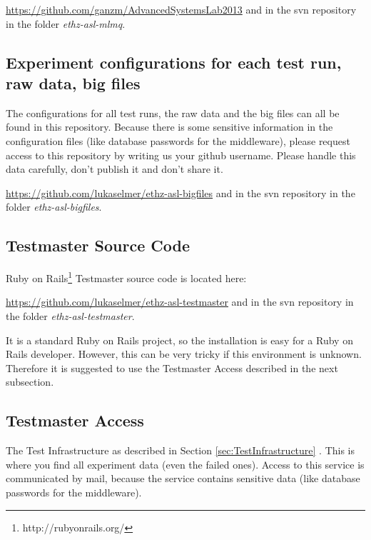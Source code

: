 \documentclass[a4paper]{article}
\begin{document}
\url{https://github.com/ganzm/AdvancedSystemsLab2013}
and in the svn repository in the folder \textit{ethz-asl-mlmq}.


\subsection{Experiment configurations for each test run, raw data, big files}
The configurations for all test runs, the raw data and the big files can all be found in this repository. Because there is some sensitive information in the configuration files (like database passwords for the middleware), please request access to this repository by writing us your github username. Please handle this data carefully, don't publish it and don't share it.

\url{https://github.com/lukaselmer/ethz-asl-bigfiles}
and in the svn repository in the folder \textit{ethz-asl-bigfiles}.

%

\subsection{Testmaster Source Code}
Ruby on Rails\footnote{http://rubyonrails.org/} Testmaster source code is located here:

\url{https://github.com/lukaselmer/ethz-asl-testmaster}
and in the svn repository in the folder \textit{ethz-asl-testmaster}.

It is a standard Ruby on Rails project, so the installation is easy for a Ruby on Rails developer. However, this can be very tricky if this environment is unknown. Therefore it is suggested to use the Testmaster Access described in the next subsection.

\subsection{Testmaster Access}
The Test Infrastructure as described in Section \ref{sec:TestInfrastructure}   . This is where you find all experiment data (even the failed ones). Access to this service is communicated by mail, because the service contains sensitive data (like database passwords for the middleware).
\end{document}
